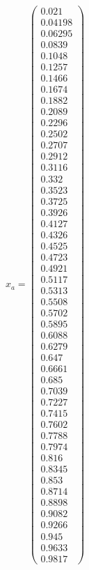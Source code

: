 \documentclass{udpreport}
\begin{document}
\begin{enumerate}
\begin {enumerate}
\begin{enumerate}
\begin{itemize}
				$x_{a} = \left(\begin{array}{c} 0.021\\ 0.04198\\ 0.06295\\ 0.0839\\ 0.1048\\ 0.1257\\ 0.1466\\ 0.1674\\ 0.1882\\ 0.2089\\ 0.2296\\ 0.2502\\ 0.2707\\ 0.2912\\ 0.3116\\ 0.332\\ 0.3523\\ 0.3725\\ 0.3926\\ 0.4127\\ 0.4326\\ 0.4525\\ 0.4723\\ 0.4921\\ 0.5117\\ 0.5313\\ 0.5508\\ 0.5702\\ 0.5895\\ 0.6088\\ 0.6279\\ 0.647\\ 0.6661\\ 0.685\\ 0.7039\\ 0.7227\\ 0.7415\\ 0.7602\\ 0.7788\\ 0.7974\\ 0.816\\ 0.8345\\ 0.853\\ 0.8714\\ 0.8898\\ 0.9082\\ 0.9266\\ 0.945\\ 0.9633\\ 0.9817 \end{array}\right)$
				

\end{itemize}
\end{enumerate}
\end{enumerate}
\end{enumerate}
\end{document}
